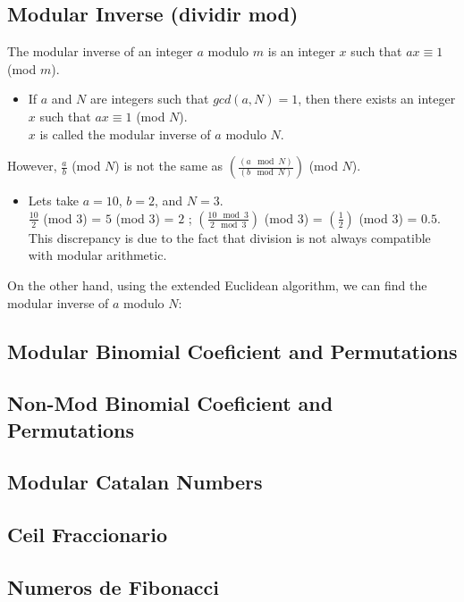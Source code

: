 \subsection{Modular Inverse (dividir mod)}
\begin{justify}
The modular inverse of an integer $a$ modulo $m$ is an integer $x$ such that $ax \equiv 1$ (mod $m$).\\
\begin{itemize}
\item If $a$ and $N$ are integers such that $gcd(a, N) = 1$, then there exists an integer $x$ such that $ax \equiv 1$ (mod $N$).\\
$x$ is called the modular inverse of $a$ modulo $N$.
\end{itemize}
However, $\frac{a}{b}$ (mod $N$) is not the same as $(\frac{(a \mod N)}{(b \mod N)})$ (mod $N$).\\
\begin{itemize}
\item Lets take $a = 10$, $b = 2$, and $N = 3$.\\
$\frac{10}{2}$ (mod $3$) = $5$ (mod $3$) = $2$ ; $(\frac{10 \mod 3}{2 \mod 3})$ (mod $3$) = $(\frac{1}{2})$ (mod $3$) = $0.5$.\\
This discrepancy is due to the fact that division is not always compatible with modular arithmetic.
\end{itemize}
On the other hand, using the extended Euclidean algorithm, we can find the modular inverse of $a$ modulo $N$:
\end{justify}
\subsection{Modular Binomial Coeficient and Permutations}
\subsection{Non-Mod Binomial Coeficient and Permutations}
\subsection{Modular Catalan Numbers}
\subsection{Ceil Fraccionario}
\subsection{Numeros de Fibonacci}
